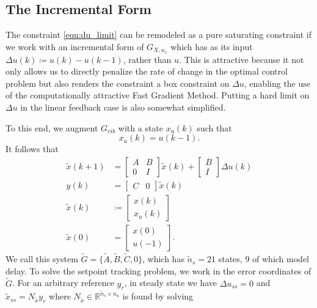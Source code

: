 \documentclass[journal,twocolumn,twoside]{IEEEtran}
\newcommand{\du}{\ensuremath{\Delta u }\xspace}
\newcommand{\Gd}{\ensuremath{\tilde G }\xspace}
\newcommand{\Ad}{\ensuremath{\tilde A }\xspace}
\newcommand{\Bd}{\ensuremath{\tilde B }\xspace}
\newcommand{\Cd}{\ensuremath{\tilde C }\xspace}
\newcommand{\xd}{\ensuremath{\tilde x }\xspace}
\newcommand{\x}{\ensuremath{x }\xspace}
\newcommand{\xdss}{\ensuremath{\tilde x_{ss} }\xspace}
\newcommand{\y}{\ensuremath{y} \xspace}
\begin{document}
\subsection{The Incremental Form}\label{sec:incremental}
The constraint \eqref{eqn:du_limit} can be remodeled as a pure saturating constraint if we work with an incremental form of \(G_{X,u_x}\) which has as its input \({\Delta u(k)\coloneqq u(k)-u(k-1)}\), rather than \(u\). This is attractive because it not only allows us to directly penalize the rate of change in the optimal control problem but also renders the constraint a box constraint on $\Delta u$, enabling the use of the computationally attractive Fast Gradient Method. Putting a hard limit on $\Delta u$ in the linear feedback case is also somewhat simplified.

To this end, we augment \(G_{vib}\) with a state \(\x_{\text{u}}(k)\) such that
\begin{equation*}
  \x_u(k) = u(k-1).
\end{equation*}
It follows that
\begin{subequations}
\begin{align}
  \xd(k+1)
  &=
    \begin{bmatrix}
      A & B\\ 0 & I
    \end{bmatrix}
    \xd(k)
    +
    \begin{bmatrix}
      B\\I
    \end{bmatrix}
  \Delta u(k) \\
  \y(k) & = \begin{bmatrix}C & 0\end{bmatrix}\xd(k)\\
  \xd(k)& \coloneqq \begin{bmatrix}\x(k)\\\x_u(k) \end{bmatrix}\\
  \xd(0) & = \begin{bmatrix}\x(0)\\u(-1)\end{bmatrix}. \label{eqn:x0_aug}
\end{align}\label{eqn:ssdelta}%
\end{subequations}
We call this system \(\Gd = \{\Ad, \Bd, \Cd, 0\}\), which has \({\tilde{n}_s=21}\) states, 9 of which model delay.
To solve the setpoint tracking problem, we work in the error
coordinates of \(\Gd\).
For an arbitrary reference \(\y_r\), in steady state we have \({\du_{ss}=0}\) and \(\xdss =N_{\xd}\y_r\) where \({N_{\xd}\in\mathds{R}^{\tilde{n}_s\times n_u} }\) is found by solving
\end{document}

